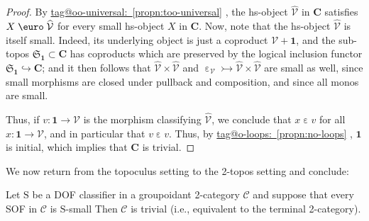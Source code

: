 \documentclass{amsart}
\makeatletter
\newcommand\bC{\mathbf{C}}
\newcommand\cC{\mathcal{C}}
\newcommand\cV{\mathcal{V}}
\newcommand\Ein{\mathrel{\text{\textup{\euro}}}}
\newcommand\ein{\mathrel{\varepsilon}}
\newcommand\fS{\mathfrak{S}}
\newcommand\hto{\hookrightarrow}
\newcommand\rS{\mathrm{S}}
\newcommand\tm{\mathbf{1}}
\newcommand\tto{\rightarrowtail}
\newcommand\unein{{\ein}}
\newcommand\wh[1]{\widehat{#1}}
\newcommand\tagword[1]{\csname tag@#1\endcsname}
\def\label@tag#1:#2\@nil{#1}
\newcommand\labeltag[1]{\label@tag#1:\@nil}
\newcommand\jref[1]{%
  \texorpdfstring%
    {\hyperref[#1]{\tagword{\labeltag{#1}}~\ref*{#1}}}%
    {\tagword{\labeltag{#1}}~\ref*{#1}}%
}
\theoremstyle{definition}
\theoremstyle{remark}
\theoremstyle{plainwithref}
\makeatother
\begin{document}
\begin{proof}
  By \jref{propn:too-universal}, the hs-object \( \wh \cV \) in \( \bC \) satisfies \( X \Ein \wh \cV \) for every small hs-object \( X \) in \( \bC \).
  Now, note that the hs-object \( \wh \cV \) is itself small.
  Indeed, its underlying object is just a coproduct \( \cV + \tm \), and the sub-topos \( \fS_\tm \subset \bC \) has coproducts which are preserved by the logical inclusion functor \( \fS_\tm \hto \bC \); and it then follows that \( \wh \cV \times \wh \cV \) and \( \unein_\cV \tto \wh \cV \times \wh \cV \) are small as well, since small morphisms are closed under pullback and composition, and since all monos are small.

  Thus, if \( v \colon \tm \to \cV \) is the morphism classifying \( \wh \cV \), we conclude that \( x \ein v \) for all \( x \colon \tm \to \cV \), and in particular that \( v \ein v \).
  Thus, by \jref{propn:no-loops}, \( \tm \) is initial, which implies that \( \bC \) is trivial.
\end{proof}

We now return from the topoculus setting to the 2-topos setting and conclude:
\begin{cor} \label{cor:2-topos-world-explodes}
  Let \( \rS \) be a DOF classifier in a groupoidant 2-category \( \cC \) and suppose that every SOF in \( \cC \) is \( \rS \)-small
  Then \( \cC \) is trivial (i.e., equivalent to the terminal 2-category).
\end{cor}
\end{document}

